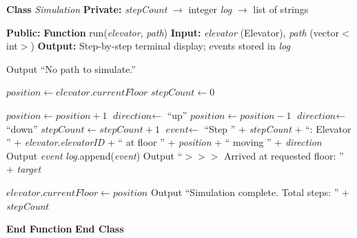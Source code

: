 \documentclass[a4paper,11pt]{article}
\begin{document}
\begin{algorithm}
\caption{Run Simulation}
\begin{algorithmic}[1]

\State \textbf{Class} \textit{Simulation}
\State \hspace{0.5cm} \textbf{Private:}
\State \hspace{1cm} \textit{stepCount} $\rightarrow$ integer
\State \hspace{1cm} \textit{log} $\rightarrow$ list of strings

\State \hspace{0.5cm} \textbf{Public:}
\State \hspace{1cm} \textbf{Function} run(\textit{elevator}, \textit{path})
\State \hspace{1.5cm} \textbf{Input:} \textit{elevator} (Elevator), \textit{path} (vector$<$int$>$)
\State \hspace{1.5cm} \textbf{Output:} Step-by-step terminal display; events stored in \textit{log}

    \State Output ``No path to simulate.''
    \State \Return
\EndIf

\State $\textit{position} \leftarrow \textit{elevator}.\textit{currentFloor}$
\State $\textit{stepCount} \leftarrow 0$

            \State $\textit{position} \leftarrow \textit{position} + 1$
            \State $\textit{direction} \leftarrow$ ``up''
        \Else
            \State $\textit{position} \leftarrow \textit{position} - 1$
            \State $\textit{direction} \leftarrow$ ``down''
        \EndIf
        \State $\textit{stepCount} \leftarrow \textit{stepCount} + 1$
        \State $\textit{event} \leftarrow$ ``Step '' + \textit{stepCount} + ``: Elevator '' + \textit{elevator}.\textit{elevatorID} + `` at floor '' + \textit{position} + `` moving '' + \textit{direction}
        \State Output \textit{event}
        \State \textit{log}.append(\textit{event})
    \EndWhile
    \State Output ``$>>>$ Arrived at requested floor: '' + \textit{target}
\EndFor

\State $\textit{elevator}.\textit{currentFloor} \leftarrow \textit{position}$
\State Output ``Simulation complete. Total steps: '' + \textit{stepCount}

\State \hspace{1cm} \textbf{End Function}
\State \textbf{End Class}

\end{algorithmic}
\end{algorithm}
\end{document}
